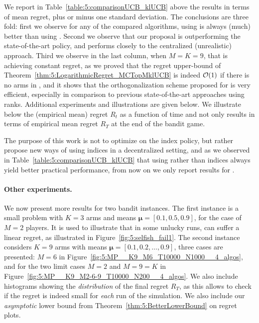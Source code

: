We report in Table~\ref{table:5:comparisonUCB_klUCB} above the results in terms of mean regret, plus or minus one standard deviation.
The conclusions are three fold: first we observe for any of the compared algorithms, using \klUCB{} is always (much) better than using \UCB.
Second we observe that our proposal \MCTopM{} is outperforming the state-of-the-art \RhoRand{} policy, and performs closely to the centralized (unrealistic) approach.
Third we observe in the last column, when $M=K=9$, that \MCTopM{} is achieving constant regret, as we proved that the regret upper-bound of Theorem~\ref{thm:5:LogarithmicRegret_MCTopMklUCB} is indeed $\mathcal{O}(1)$ if there is no arms in \Mworst{}, and it shows that the orthogonalization scheme proposed for \MCTopM{} is very efficient, especially in comparison to previous state-of-the-art approaches using ranks.
%
Additional experiments and illustrations are given below.
We illustrate below the (empirical mean) regret $R_t$ as a function of time and not only results in terms of empirical mean regret $R_T$ at the end of the bandit game.


The purpose of this work is not to optimize on the index policy, but rather propose new ways of using indices in a decentralized setting,
and as we observed in Table~\ref{table:5:comparisonUCB_klUCB} that using \klUCB{} rather than \UCB{} indices always yield better practical performance,
from now on we only report results for \klUCB.


\paragraph{Other experiments.}
%
We now present more results for two bandit instances.
  The first instance is a small problem with $K=3$ arms and means
  $\boldsymbol{\mu} = [0.1, 0.5, 0.9]$, for the case of $M=2$ players.
  It is used to illustrate that in some unlucky runs, \Selfish{} can suffer a linear regret, as illustrated in Figure~\ref{fig:5:selfish_fail1}.
  The second instance considers $K=9$ arms with means $\boldsymbol{\mu} = [0.1, 0.2, \dots, 0.9]$,
  three cases are presented: $M=6$ in Figure~\ref{fig:5:MP__K9_M6_T10000_N1000__4_algos},
  and for the two limit cases $M=2$ and $M=9=K$ in Figure~\ref{fig:5:MP__K9_M2-6-9_T10000_N200__4_algos}.
%
We also include histograms showing the \emph{distribution} of the final regret $R_T$,
as this allows to check if the regret is indeed small for \emph{each} run of the simulation.
%
We also include our \emph{asymptotic} lower bound from Theorem~\ref{thm:5:BetterLowerBound} on regret plots.


